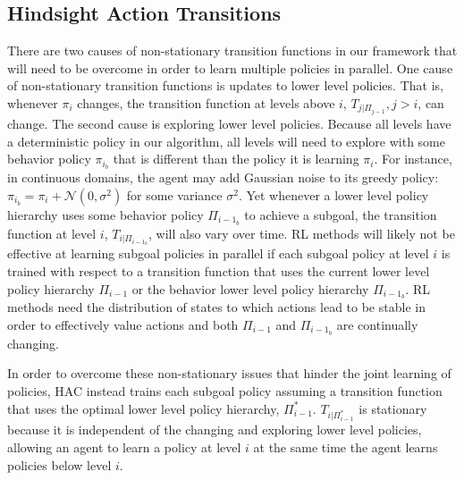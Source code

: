 \documentclass{article} %
\begin{document}
\subsection{Hindsight Action Transitions}

There are two causes of non-stationary transition functions in our framework that will need to be overcome in order to learn multiple policies in parallel.  One cause of non-stationary transition functions is updates to lower level policies.  That is, whenever $\pi_i$ changes, the transition function at levels above $i$, $T_{j|\Pi_{j-1}}, j>i$, can change.  The second cause is exploring lower level policies.  Because all levels have a deterministic policy in our algorithm, all levels will need to explore with some behavior policy $\pi_{i_b}$ that is different than the policy it is learning $\pi_i$.  For instance, in continuous domains, the agent may add Gaussian noise to its greedy policy: $\pi_{i_b} = \pi_i + \mathcal{N}(0,\sigma^2)$ for some variance $\sigma^2$.  Yet whenever a lower level policy hierarchy uses some behavior policy $\Pi_{i-1_b}$ to achieve a subgoal, the transition function at level $i$, $T_{i|\Pi_{i-1_b}}$, will also vary over time.  RL methods will likely not be effective at learning subgoal policies in parallel if each subgoal policy at level $i$ is trained with respect to a transition function that uses the current lower level policy hierarchy $\Pi_{i-1}$ or the behavior lower level policy hierarchy $\Pi_{i-1_b}$.  RL methods need the distribution of states to which actions lead to be stable in order to effectively value actions and both $\Pi_{i-1}$ and $\Pi_{i-1_b}$ are continually changing.

In order to overcome these non-stationary issues that hinder the joint learning of policies, HAC instead trains each subgoal policy assuming a transition function that uses the optimal lower level policy hierarchy, $\Pi_{i-1}^*$.  $T_{i|\Pi_{i-1}^*}$ is stationary because it is independent of the changing and exploring lower level policies, allowing an agent to learn a policy at level $i$ at the same time the agent learns policies below level $i$.  
\end{document}
